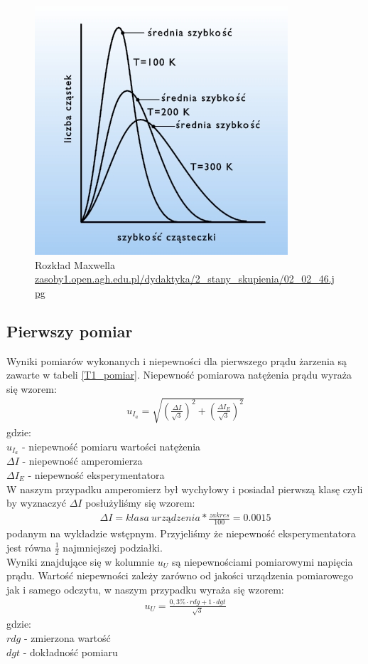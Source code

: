 \documentclass[a4paper]{article}
\newlength{\du}
\begin{document}
\begin{figure}[h!]
\centering
\includegraphics[scale=0.5]{rozlad_maxwella.jpg}
\caption{Rozkład Maxwella \url{zasoby1.open.agh.edu.pl/dydaktyka/2_stany_skupienia/02_02_46.jpg}}
\end{figure}

\newpage
\subsection{Pierwszy pomiar}
Wyniki pomiarów wykonanych i niepewności dla pierwszego prądu żarzenia są zawarte w tabeli \ref{T1_pomiar}. Niepewność pomiarowa natężenia prądu wyraża się wzorem: 
\begin{align*}
u_{I_{a}} = \sqrt{(\frac{\Delta I}{\sqrt{3}})^2 + (\frac{\Delta I_{E}}{\sqrt{3}})^2}
\end{align*}
gdzie:\\
$u_{I_{a}}$ - niepewność pomiaru wartości natężenia \\
$\Delta I$ - niepewność amperomierza \\
$\Delta I_{E}$ - niepewność eksperymentatora\\

W naszym przypadku amperomierz był wychyłowy i posiadał pierwszą klasę czyli by wyznaczyć $\Delta I$ posłużyliśmy się wzorem:
\begin{align*}
\Delta I = klasa\ urządzenia * \frac{zakres}{100} = 0.0015
\end{align*}
podanym na wykładzie wstępnym.
Przyjeliśmy że niepewność eksperymentatora jest równa $\frac{1}{2}$ najmniejszej podziałki.\\

Wyniki znajdujące się w kolumnie $u_{U}$ są niepewnościami pomiarowymi napięcia prądu. Wartość niepewności zależy zarówno od jakości urządzenia pomiarowego jak i samego odczytu, w naszym przypadku wyraża się wzorem:
\begin{align*}
u_{U} = \frac{0,3 \% \cdot rdg + 1 \cdot dgt}{\sqrt{3}}
\end{align*}
gdzie: \\
$rdg$ - zmierzona wartość \\
$dgt$ - dokładność pomiaru \\
\end{document}
